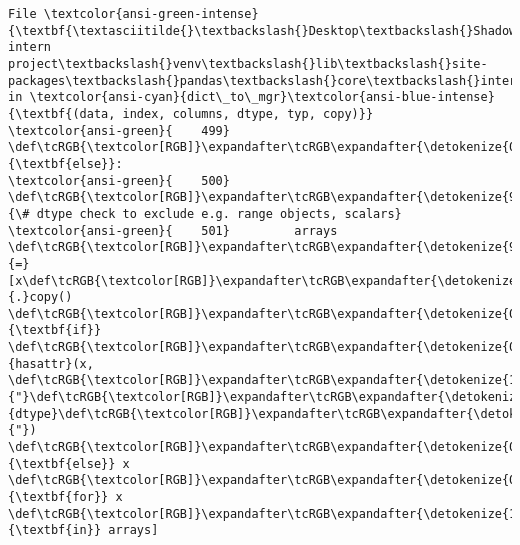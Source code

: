\documentclass[11pt]{article}
\begin{document}
\begin{Verbatim}[commandchars=\\\{\}, frame=single, framerule=2mm, rulecolor=\color{outerrorbackground}]
File \textcolor{ansi-green-intense}{\textbf{\textasciitilde{}\textbackslash{}Desktop\textbackslash{}Shadowfox intern project\textbackslash{}venv\textbackslash{}lib\textbackslash{}site-packages\textbackslash{}pandas\textbackslash{}core\textbackslash{}internals\textbackslash{}construction.py:503}}, in \textcolor{ansi-cyan}{dict\_to\_mgr}\textcolor{ansi-blue-intense}{\textbf{(data, index, columns, dtype, typ, copy)}}
\textcolor{ansi-green}{    499}     \def\tcRGB{\textcolor[RGB]}\expandafter\tcRGB\expandafter{\detokenize{0,135,0}}{\textbf{else}}:
\textcolor{ansi-green}{    500}         \def\tcRGB{\textcolor[RGB]}\expandafter\tcRGB\expandafter{\detokenize{95,135,135}}{\# dtype check to exclude e.g. range objects, scalars}
\textcolor{ansi-green}{    501}         arrays \def\tcRGB{\textcolor[RGB]}\expandafter\tcRGB\expandafter{\detokenize{98,98,98}}{=} [x\def\tcRGB{\textcolor[RGB]}\expandafter\tcRGB\expandafter{\detokenize{98,98,98}}{.}copy() \def\tcRGB{\textcolor[RGB]}\expandafter\tcRGB\expandafter{\detokenize{0,135,0}}{\textbf{if}} \def\tcRGB{\textcolor[RGB]}\expandafter\tcRGB\expandafter{\detokenize{0,135,0}}{hasattr}(x, \def\tcRGB{\textcolor[RGB]}\expandafter\tcRGB\expandafter{\detokenize{175,0,0}}{"}\def\tcRGB{\textcolor[RGB]}\expandafter\tcRGB\expandafter{\detokenize{175,0,0}}{dtype}\def\tcRGB{\textcolor[RGB]}\expandafter\tcRGB\expandafter{\detokenize{175,0,0}}{"}) \def\tcRGB{\textcolor[RGB]}\expandafter\tcRGB\expandafter{\detokenize{0,135,0}}{\textbf{else}} x \def\tcRGB{\textcolor[RGB]}\expandafter\tcRGB\expandafter{\detokenize{0,135,0}}{\textbf{for}} x \def\tcRGB{\textcolor[RGB]}\expandafter\tcRGB\expandafter{\detokenize{175,0,255}}{\textbf{in}} arrays]

\end{Verbatim}
\end{document}

